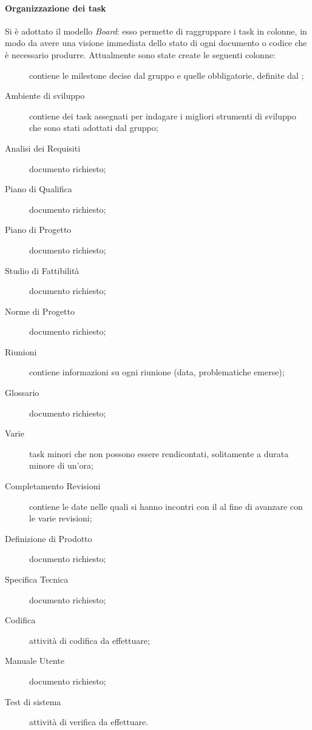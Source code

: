 \paragraph{Organizzazione dei task} Si è adottato il modello \emph{Board}: esso permette di raggruppare i task in colonne, in modo da avere una visione immediata dello stato di ogni documento o codice che è necessario produrre.
Attualmente sono state create le seguenti colonne:
\begin{description}
	\item[] contiene le milestone decise dal gruppo e quelle obbligatorie, definite dal \TV;
	\item[Ambiente di sviluppo] contiene dei task assegnati per indagare i migliori strumenti di sviluppo che sono stati adottati dal gruppo;
	\item[Analisi dei Requisiti] documento richiesto;
	\item[Piano di Qualifica] documento richiesto;
	\item[Piano di Progetto] documento richiesto;
	\item[Studio di Fattibilità] documento richiesto;
	\item[Norme di Progetto] documento richiesto;
	\item[Riunioni] contiene informazioni su ogni riunione (data, problematiche emerse);
	\item[Glossario] documento richiesto;
	\item[Varie] task minori che non possono essere rendicontati, solitamente a durata minore di un'ora;
	\item[Completamento Revisioni] contiene le date nelle quali si hanno incontri con il \TV al fine di avanzare con le varie revisioni; 
	\item[Definizione di Prodotto] documento richiesto;
	\item[Specifica Tecnica] documento richiesto;
	\item[Codifica] attività di codifica da effettuare;
	\item[Manuale Utente] documento richiesto;
	\item[Test di sistema] attività di verifica da effettuare.
\end{description}
